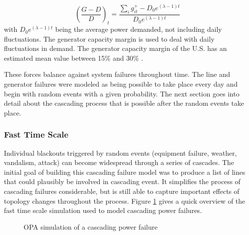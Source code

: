 \begin{enumerate}
\begin{equation}
\left(\frac{G-D}{D}\right)_t = \frac{\sum_i g_{it}^+ - D_0 e^{(\lambda-1)t} }{D_0 e^{(\lambda-1)t}}
\end{equation}
with $D_0 e^{(\lambda-1)t}$ being the average power demanded, not including daily fluctuations.  The generator capacity margin is used to deal with daily fluctuations in demand.  The generator capacity margin of the U.S. has an estimated mean value between 15\% and 30\% \cite{carreras_2004}.
\end{enumerate}

These forces balance against system failures throughout time.  The line and generator failures were modeled as being possible to take place every day and begin with random events with a given probability.  The next section goes into detail about the cascading process that is possible after the random events take place.

\subsubsection{Fast Time Scale}

Individual blackouts triggered by random events (equipment failure, weather, vandalism, attack) can become widespread through a series of cascades. 
The initial goal of building this cascading failure model was to produce a list of lines that could plausibly be involved in cascading event.  It simplifies the process of cascading failures considerable, but is still able to capture important effects of topology changes throughout the process.  Figure \ref{fig:cascade} gives a quick overview of the fast time scale simulation used to model cascading power failures.

\begin{figure}
\centering
{} 
\caption{OPA simulation of a cascading power failure}
  \label{fig:cascade}
\end{figure}


